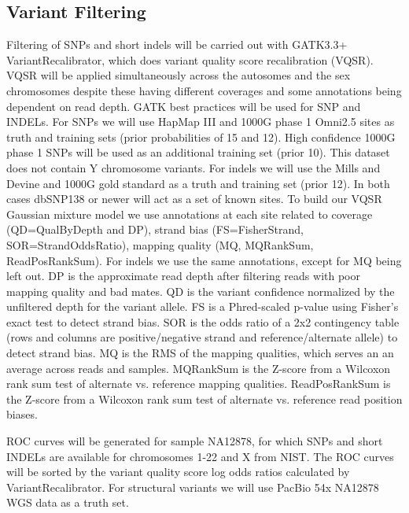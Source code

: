 \subsection{Variant Filtering}
Filtering of SNPs and short indels will be carried out with GATK3.3+ VariantRecalibrator, which does variant quality score recalibration (VQSR). VQSR will be applied simultaneously across the autosomes and the sex chromosomes despite these having different coverages and some annotations being dependent on read depth. GATK best practices will be used for SNP and INDELs.
For SNPs we will use HapMap III and 1000G phase 1 Omni2.5 sites as truth and training sets (prior probabilities of 15 and 12). High confidence 1000G phase 1 SNPs will be used as an additional training set (prior 10). This dataset does not contain Y chromosome variants. For indels we will use the Mills and Devine and 1000G gold standard as a truth and training set (prior 12). In both cases dbSNP138 or newer will act as a set of known sites.
To build our VQSR Gaussian mixture model we use annotations at each site related to coverage (QD=QualByDepth and DP), strand bias (FS=FisherStrand, SOR=StrandOddsRatio), mapping quality (MQ, MQRankSum, ReadPosRankSum). For indels we use the same annotations, except for MQ being left out.
DP is the approximate read depth after filtering reads with poor mapping quality and bad mates. QD is the variant confidence normalized by the unfiltered depth for the variant allele. FS is a Phred-scaled p-value using Fisher's exact test to detect strand bias. SOR is the odds ratio of a 2x2 contingency table (rows and columns are positive/negative strand and reference/alternate allele) to detect strand bias. MQ is the RMS of the mapping qualities, which serves an an average across reads and samples. MQRankSum is the Z-score from a Wilcoxon rank sum test of alternate vs. reference mapping qualities. ReadPosRankSum is the Z-score from a Wilcoxon rank sum test of alternate vs. reference read position biases.

ROC curves will be generated for sample NA12878, for which SNPs and short INDELs are available for chromosomes 1-22 and X from NIST. The ROC curves will be sorted by the variant quality score log odds ratios calculated by VariantRecalibrator. For structural variants we will use PacBio 54x NA12878 WGS data as a truth set.

